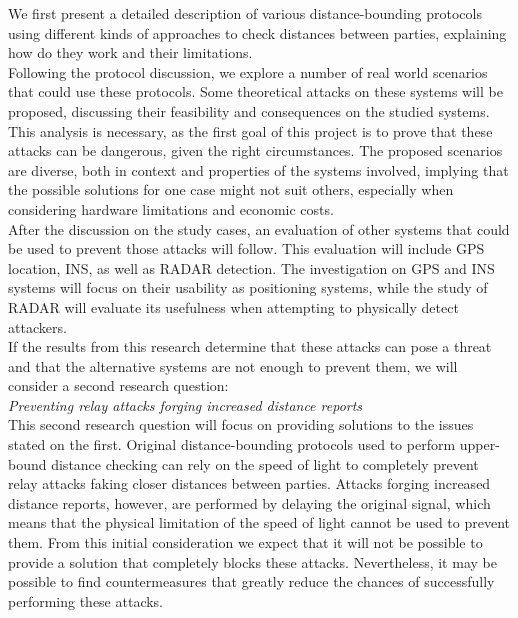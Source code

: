 \documentclass{article}
\begin{document}
We first present a detailed description of various distance-bounding protocols using different kinds of approaches to check distances between parties, explaining how do they work and their limitations.\\

Following the protocol discussion, we explore a number of real world scenarios that could use these protocols. Some theoretical attacks on these systems will be proposed, discussing their feasibility and consequences on the studied systems. This analysis is necessary, as the first goal of this project is to prove that these attacks can be dangerous, given the right circumstances. The proposed scenarios are diverse, both in context and properties of the systems involved, implying that the possible solutions for one case might not suit others, especially when considering hardware limitations and economic costs.\\

After the discussion on the study cases, an evaluation of other systems that could be used to prevent those attacks will follow. This evaluation will include GPS location, INS, as well as RADAR detection. The investigation on GPS and INS systems will focus on their usability as positioning systems, while the study of RADAR will evaluate its usefulness when attempting to physically detect attackers.\\

If the results from this research determine that these attacks can pose a threat and that the alternative systems are not enough to prevent them, we will consider a second research question:\\

\emph{Preventing relay attacks forging increased distance reports}\\

This second research question will focus on providing solutions to the issues stated on the first. Original distance-bounding protocols used to perform upper-bound distance checking can rely on the speed of light to completely prevent relay attacks faking closer distances between parties. Attacks forging increased distance reports, however, are performed by delaying the original signal, which means that the physical limitation of the speed of light cannot be used to prevent them. From this initial consideration we expect that it will not be possible to provide a solution that completely blocks these attacks. Nevertheless, it may be possible to find countermeasures that greatly reduce the chances of successfully performing these attacks.\\
\end{document}
